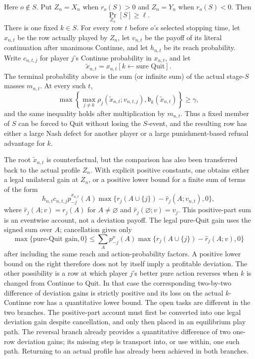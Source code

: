 \documentclass[11pt]{article}
\begin{document}
Here $o\notin S$.  Put $Z_n=X_n$ when $r_o(S)>0$ and $Z_n=Y_n$ when
$r_o(S)<0$.  Then
\[
 \Pr_{Z_n}[S]\ge\ell.
\]
There is one fixed $k\in S$.  For every row $t$ before $o$'s selected
stopping time, let $x_{n,t}$ be the row actually played by $Z_n$, let
$v_{n,t}$ be the payoff of its literal continuation after unanimous
Continue, and let $h_{n,t}$ be its reach probability.  Write
$c_{n,t,j}$ for player $j$'s Continue probability in $x_{n,t}$, and let
\[
 \widetilde x_{n,t}
   =x_{n,t}[k\leftarrow\text{sure Quit}].
\]
The terminal probability above is the sum (or infinite sum) of the actual
stage-$S$ masses $m_{n,t}$.  At every such $t$,
\[
 \max\left\{
   \max_{j\ne k}\rho_j(\widetilde x_{n,t};v_{n,t,j}),
   \mathfrak b_k(\widetilde x_{n,t})
 \right\}\ge\gamma,
\]
and the same inequality holds after multiplication by $m_{n,t}$.  Thus a
fixed member of $S$ can be forced to Quit without losing the $S$-event, and
the resulting row has either a large Nash defect for another player or a
large punishment-based refusal advantage for $k$.

The root $\widetilde x_{n,t}$ is counterfactual, but the comparison has also
been transferred back to the actual profile $Z_n$.  With explicit positive
constants, one obtains either a legal unilateral gain at $Z_n$, or a positive
lower bound for a finite sum of terms of the form
\[
 h_{n,t}c_{n,t,j}p^{x_{n,t}}_{-j}(A)
 \max\{r_j(A\cup\{j\})-\widehat r_j(A;v_{n,t}),0\},
\]
where $\widehat r_j(A;v)=r_j(A)$ for $A\ne\varnothing$ and
$\widehat r_j(\varnothing;v)=v_j$.  This positive-part sum is an eventwise
account, not a deviation payoff.  The legal pure-Quit gain uses the signed
sum over $A$; cancellation gives only
\[
 \max\{\text{pure-Quit gain},0\}
 \le \sum_A p^x_{-j}(A)
       \max\{r_j(A\cup\{j\})-\widehat r_j(A;v),0\}
\]
after including the same reach and action-probability factors.  A positive
lower bound on the right therefore does not by itself imply a profitable
deviation.  The other possibility is a row at
which player $j$'s better pure action reverses when $k$ is changed from
Continue to Quit.  In that case the corresponding
two-by-two difference of deviation gains is strictly positive and its loss
on the actual $k$-Continue row has a quantitative lower bound.  The open
tasks are different in the two branches.  The positive-part account must
first be converted into one legal deviation gain despite cancellation, and
only then placed in an equilibrium play path.  The reversal branch already
provides a quantitative difference of two one-row deviation gains; its missing step
is transport into, or use within, one such path.  Returning to an actual profile
has already been achieved in both branches.
\end{document}
